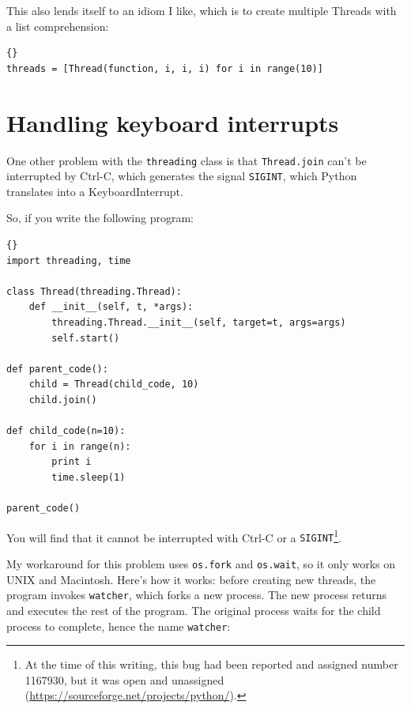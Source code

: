 \documentclass{book}
\begin{document}
This also lends itself to an idiom I like, which is to create
multiple Threads with a list comprehension:

\begin{latin}
\begin{lstlisting}[title={Multiple thread example}]{}
threads = [Thread(function, i, i, i) for i in range(10)]
\end{lstlisting}
\end{latin}

\section{Handling keyboard interrupts}

One other problem with the {\tt threading} class is that 
{\tt Thread.join} can't be interrupted by Ctrl-C, which
generates the signal {\tt SIGINT}, which Python translates
into a KeyboardInterrupt.

\newpage
So, if you write the following program:

\begin{latin}
\begin{lstlisting}[title={Unstoppable program}]{}
import threading, time

class Thread(threading.Thread):
    def __init__(self, t, *args):
        threading.Thread.__init__(self, target=t, args=args)
        self.start()

def parent_code():
    child = Thread(child_code, 10)
    child.join()

def child_code(n=10):
    for i in range(n):
        print i
        time.sleep(1)
    
parent_code()
\end{lstlisting}
\end{latin}

You will find that it cannot be interrupted with Ctrl-C or
a {\tt SIGINT}\footnote{At the time of this writing, this
bug had been reported and assigned number 1167930, but it was
open and unassigned (\url{https://sourceforge.net/projects/python/}).}.

My workaround for this problem uses {\tt os.fork} and {\tt os.wait},
so it only works on UNIX and Macintosh.  Here's how it works:
before creating new threads, the program invokes {\tt watcher},
which forks a new process.  The new process returns and executes
the rest of the program.  The original process waits for the
child process to complete, hence the name {\tt watcher}:
\end{document}
